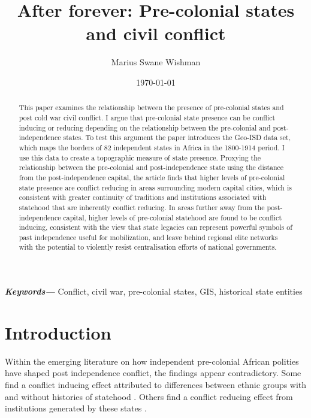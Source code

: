 \documentclass[12pt]{article}
\title{After forever: Pre-colonial states and civil conflict}
\author[1]{Marius Swane Wishman}
\affil[1]{Department of Sociology and Political Science, NTNU}
\date{\today}
\providecommand{\keywords}[1]
{
	\small	
	\textbf{\textit{Keywords---}} #1
}
\begin{document}
\maketitle

\begin{abstract}

This paper examines the relationship between the presence of pre-colonial states
and post cold war civil conflict. I argue that pre-colonial state presence can
be conflict inducing or reducing depending on the relationship between the
pre-colonial and post-independence states. To test this argument the paper
introduces the Geo-ISD data set, which maps the borders of 82 independent states
in Africa in the 1800-1914 period. I use this data to create a topographic
measure of state presence. Proxying the relationship between the pre-colonial
and post-independence state using the distance from the post-independence
capital, the article finds that higher levels of pre-colonial state presence are
conflict reducing in areas surrounding modern capital cities, which is
consistent with greater continuity of traditions and institutions associated
with statehood that are inherently conflict reducing. In areas further away from
the post-independence capital, higher levels of pre-colonial statehood are found
to be conflict inducing, consistent with the view that state legacies can
represent powerful symbols of past independence useful for mobilization, and
leave behind regional elite networks with the potential to violently resist
centralisation efforts of national governments. 

\end{abstract}

\keywords{Conflict, civil war, pre-colonial states, GIS, historical state
entities}


\onehalfspacing


\newpage

\section{Introduction} \label{Introduction}

Within the emerging literature on how independent pre-colonial African polities
have shaped post independence conflict, the findings appear contradictory. Some
find a conflict inducing effect attributed to differences between ethnic groups with
and without histories of statehood \citep{Englebert2002, Paine2019}. Others find
a conflict reducing effect from institutions generated by these states
\citep{Depetris-Chauvin2016, Wig2016}.
\end{document}
